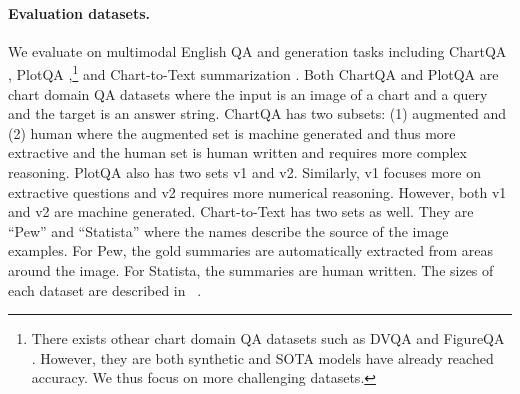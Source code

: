 \begin{table}[t!]
    \small
    \centering
\caption{Statistics of the finetuning datasets.}
    \vspace{-0.5em}
\label{tab:finetune_data}
\end{table}

\paragraph{Evaluation datasets.} We evaluate \model{} on multimodal English QA and generation tasks including ChartQA \citep{masry-etal-2022-chartqa}, PlotQA \citep{methani2020plotqa},\footnote{There exists othear chart domain QA datasets such as DVQA \citep{kafle2018dvqa} and FigureQA \citep{kahou2017figureqa}. However, they are both synthetic and SOTA models have already reached  accuracy. We thus focus on more challenging datasets.} and Chart-to-Text summarization \citep{kantharaj-etal-2022-chart}. Both ChartQA and PlotQA are chart domain QA datasets where the input is an image of a chart and a query and the target is an answer string. ChartQA has two subsets: (1) augmented and (2) human where the augmented set is machine generated and thus more extractive and the human set is human written and requires more complex reasoning. PlotQA also has two sets v1 and v2. Similarly, v1 focuses more on extractive questions and v2 requires more numerical reasoning. However, both v1 and v2 are machine generated. Chart-to-Text has two sets as well. They are ``Pew'' and ``Statista'' where the names describe the source of the image examples. For Pew, the gold summaries are automatically extracted from areas around the image. For Statista, the summaries are human written. The sizes of each dataset are described in
~.




